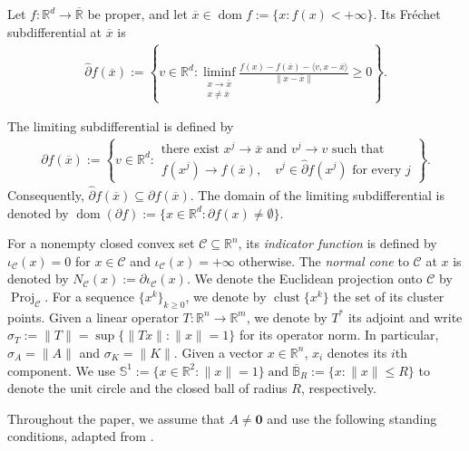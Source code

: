 \documentclass[9pt]{article}
\numberwithin{equation}{section}
\theoremstyle{definition}
\theoremstyle{remark}
\newcommand{\R}{\mathbb R}
\newcommand{\whpartial}{\widehat\partial}
\newcommand{\Sone}{\mathbb S^1}
\DeclareMathOperator{\dom}{dom}
\DeclareMathOperator{\proj}{Proj}
\DeclareMathOperator{\clust}{clust}
\begin{document}
Let $f:\R^d\to\overline{\R}$ be proper, and let
$\overline x\in\dom f:=\{x:f(x)<+\infty\}$. Its Fr\'echet
subdifferential at $\overline x$ is
\begin{eqnarray*}\label{eq:frechet}
 \whpartial f(\overline x)
 :=\left\{v\in\R^d:
 \liminf_{\substack{x\to\overline x\\x\ne\overline x}}
 \frac{f(x)-f(\overline x)-\langle v,x-\overline x\rangle}
 {\|x-\overline x\|}\ge0\right\}.
\end{eqnarray*}


\noindent The limiting subdifferential is defined by
\begin{eqnarray*}\label{eq:limiting}
 \partial f(\overline x)
 :=\left\{v\in\R^d:
 \begin{array}{l}
 \text{there exist }x^j\to\overline x\text{ and }v^j\to v
 \text{ such that}\\
 f(x^j)\to f(\overline x),\quad
 v^j\in\whpartial f(x^j)\text{ for every }j
 \end{array}\right\}.
\end{eqnarray*}
Consequently, $
 \whpartial f(\overline x)\subseteq\partial f(\overline x).
$
The domain of the limiting subdifferential is denoted by
$
\dom(\partial f):=\{x\in\mathbb{R}^d:\partial f(x)\neq\emptyset\}.
$






For a nonempty closed convex set $\mathcal C\subseteq\mathbb R^n$,
its \emph{indicator function} is defined by $\iota_{\mathcal C}(x)=0$
for $x\in\mathcal C$ and $\iota_{\mathcal C}(x)=+\infty$ otherwise.
The \emph{normal cone} to \(\mathcal C\) at \(x\) is denoted by
$
N_{\mathcal C}(x):=\partial\iota_{\mathcal C}(x)
$.
We denote the Euclidean projection onto $\mathcal C$ by
$\proj_{\mathcal C}$.
For a sequence \(\{x^k\}_{k\ge0}\), we denote by
$\clust\{x^k\}$
the set of its cluster points.
Given a linear operator $T:{\mathbb R}^n\to{\mathbb R}^m$, we denote by $T^*$ its adjoint and write
$\sigma_T:=\|T\|=\sup\{\|Tx\|:\|x\|=1\}$ for its operator norm. In particular, $\sigma_A=\|A\|$ and $\sigma_K=\|K\|$.
Given a vector \(x\in\mathbb{R}^n\), \(x_i\) denotes its \(i\)th component.
 We use
$
    \Sone:=\bigl\{x\in\mathbb R^2:\|x\|=1\bigr\}
    \;\text{and}\;
    \overline{\mathbb B}_{R}
    :=\bigl\{x:\|x\|\leq R\bigr\}
$
to denote the unit circle and the closed ball of radius $R$,
respectively.

Throughout the paper, we assume that \(A\neq \mathbf{0}\) and use the
following standing conditions, adapted from
\cite[Assumption~3.1]{BotLiTao2025}.
\end{document}
